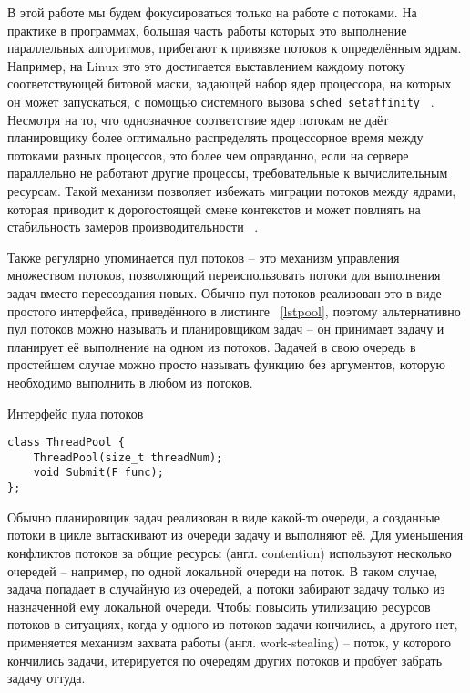 \documentclass[times,specification,annotation]{itmo-student-thesis}
\begin{document}
В этой работе мы будем фокусироваться только на работе с потоками. На практике в программах, большая часть работы которых это выполнение параллельных алгоритмов, прибегают к привязке потоков к определённым ядрам. Например, на Linux это это достигается выставлением каждому потоку соответствующей битовой маски, задающей набор ядер процессора, на которых он может запускаться, с помощью системного вызова \texttt{sched\_setaffinity} ~\cite{sched-setaffinity}. Несмотря на то, что однозначное соответствие ядер потокам не даёт планировщику более оптимально распределять процессорное время между потоками разных процессов, это более чем оправданно, если на сервере параллельно не работают другие процессы, требовательные к вычислительным ресурсам. Такой механизм позволяет избежать миграции потоков между ядрами, которая приводит к дорогостоящей смене контекстов и может повлиять на стабильность замеров производительности ~\cite{protbb-pinning}.

Также регулярно упоминается пул потоков -- это механизм управления множеством потоков, позволяющий переиспользовать потоки для выполнения задач вместо пересоздания новых. Обычно пул потоков реализован это в виде простого интерфейса, приведённого в листинге ~\ref{lstpool}, поэтому альтернативно пул потоков можно называть и планировщиком задач -- он принимает задачу и планирует её выполнение на одном из потоков.
Задачей в свою очередь в простейшем случае можно просто называть функцию без аргументов, которую необходимо выполнить в любом из потоков.

\begin{algorithm}[!h]
\caption{Интерфейс пула потоков}\label{lstpool}
\begin{lstlisting}
class ThreadPool {
    ThreadPool(size_t threadNum);
    void Submit(F func);
};
\end{lstlisting}
\end{algorithm}

Обычно планировщик задач реализован в виде какой-то очереди, а созданные потоки в цикле вытаскивают из очереди задачу и выполняют её. Для уменьшения конфликтов потоков за общие ресурсы (англ. contention) используют несколько очередей -- например, по одной локальной очереди на поток. В таком случае, задача попадает в случайную из очередей, а потоки забирают задачу только из назначенной ему локальной очереди. Чтобы повысить утилизацию ресурсов потоков в ситуациях, когда у одного из потоков задачи кончились, а другого нет, применяется механизм захвата работы (англ. work-stealing) -- поток, у которого кончились задачи, итерируется по очередям других потоков и пробует забрать задачу оттуда.
\end{document}

